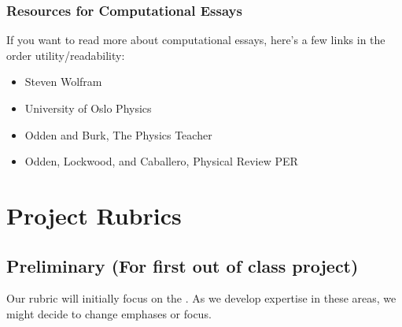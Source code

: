 \documentclass[letterpaper,10pt,english]{jupyterBook}
\begin{document}
\subsubsection{Resources for Computational Essays}
\label{\detokenize{content/0_course/assessments:resources-for-computational-essays}}
\sphinxAtStartPar
If you want to read more about computational essays, here’s a few links in the order utility/readability:
\begin{itemize}
\item {} 
\sphinxAtStartPar
Steven Wolfram \sphinxhyphen{} 

\item {} 
\sphinxAtStartPar
University of Oslo Physics \sphinxhyphen{} 

\item {} 
\sphinxAtStartPar
Odden and Burk, The Physics Teacher \sphinxhyphen{} 

\item {} 
\sphinxAtStartPar
Odden, Lockwood, and Caballero, Physical Review PER \sphinxhyphen{} 

\end{itemize}

\sphinxstepscope


\section{Project Rubrics}
\label{\detokenize{content/0_course/rubric:project-rubrics}}\label{\detokenize{content/0_course/rubric::doc}}

\subsection{Preliminary (For first out of class project)}
\label{\detokenize{content/0_course/rubric:preliminary-for-first-out-of-class-project}}
\sphinxAtStartPar
Our rubric will initially focus on the {\hyperref[\detokenize{content/0_course/goals::doc}]{}}. As we develop expertise in these areas, we might decide to change emphases or focus.
\end{document}
